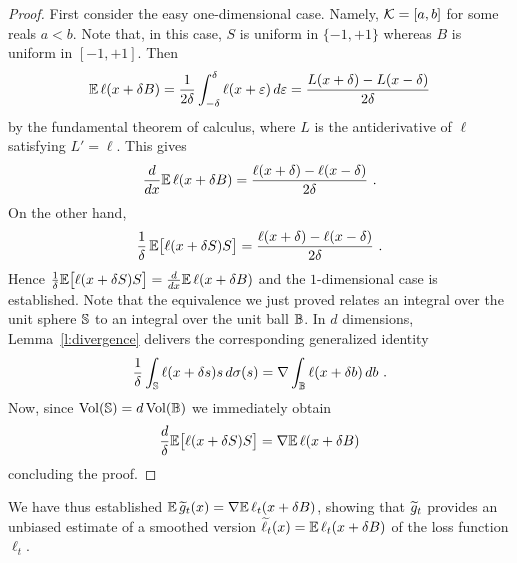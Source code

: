 \begin{proof}
First consider the easy one-dimensional case. Namely, $\mathcal{K} = [a,b]$ for some reals $a < b$. Note that, in this case, $S$ is uniform in $\{-1,+1\}$ whereas $B$ is uniform in $[-1,+1]$. Then
\begin{align*}
    \mathbb{E}\,\ell(x + \delta B)
=
    \frac{1}{2\delta}\int_{-\delta}^{\delta} \ell(x + \varepsilon)\,d\varepsilon
=
    \frac{L(x+\delta) - L(x-\delta)}{2\delta}
\end{align*}
by the fundamental theorem of calculus, where $L$ is the antiderivative of $\ell$ satisfying $L' = \ell$.
This gives
\[
    \frac{d}{dx} \mathbb{E}\,\ell(x + \delta B) = \frac{\ell(x+\delta) - \ell(x-\delta)}{2\delta}~.
\]
On the other hand,
\[
    \frac{1}{\delta}\,\mathbb{E}\bigl[\ell(x + \delta S)S\bigr]
=
    \frac{\ell(x+\delta) - \ell(x-\delta)}{2\delta}~.
\]
Hence $\tfrac{1}{\delta}\mathbb{E}\bigl[\ell(x + \delta S)S\bigr] = \tfrac{d}{dx}\mathbb{E}\,\ell(x + \delta B)$ and the $1$-dimensional case is established. Note that the equivalence we just proved relates an integral over the unit sphere $\mathbb{S}$ to an integral over the unit ball $\mathbb{B}$. In $d$ dimensions, Lemma~\ref{l:divergence} delivers the corresponding generalized identity
\[
    \frac{1}{\delta}\int_{\mathbb{S}} \ell(x + \delta s)s\, d\sigma(s)
=
    \nabla\int_{\mathbb{B}} \ell(x + \delta b)\, db~.
\]
Now, since $\mathrm{Vol}(\mathbb{S}) = d\,\mathrm{Vol}(\mathbb{B})$ we immediately obtain
\[
    \frac{d}{\delta}\mathbb{E}\bigl[\ell(x + \delta S)S\bigr]
=
    \nabla\mathbb{E}\,\ell(x + \delta B)
\]
concluding the proof.
\end{proof}
%
We have thus established $\mathbb{E}\,\widetilde{g}_t(x) = \nabla\mathbb{E}\,\ell_t(x + \delta B)$, showing that $\widetilde{g}_t$ provides an unbiased estimate of a smoothed version $\widetilde{\ell}_t(x) = \mathbb{E}\,\ell_t(x + \delta B)$ of the loss function $\ell_t$.

